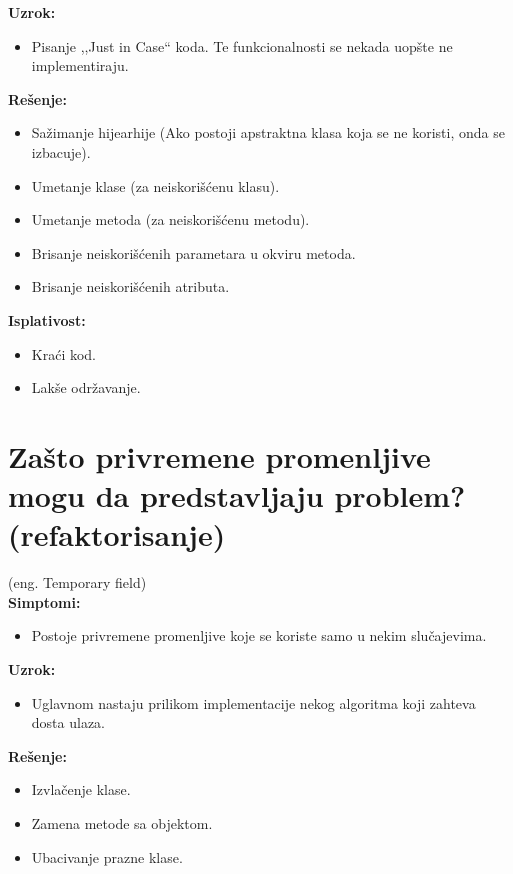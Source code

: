 \documentclass[a4paper]{article}
\begin{document}
  \noindent \textbf{Uzrok:} 
  \begin{itemize}
    \item Pisanje ,,Just in Case`` koda. Te funkcionalnosti se nekada uopšte ne implementiraju.
  \end{itemize}

  \noindent \textbf{Rešenje:} 
  \begin{itemize}
    \item Sažimanje hijearhije (Ako postoji apstraktna klasa koja se ne koristi, onda se izbacuje).
    \item Umetanje klase (za neiskorišćenu klasu).
    \item Umetanje metoda (za neiskorišćenu metodu).
    \item Brisanje neiskorišćenih parametara u okviru metoda.
    \item Brisanje neiskorišćenih atributa.
  \end{itemize}

  \noindent \textbf{Isplativost:} 
  \begin{itemize}
    \item Kraći kod.
    \item Lakše održavanje.
  \end{itemize}

\section{Zašto privremene promenljive mogu da predstavljaju problem? (refaktorisanje)}
  (eng. Temporary field)\\
  \textbf{Simptomi:}
  \begin{itemize}
    \item Postoje privremene promenljive koje se koriste samo u nekim slučajevima.
  \end{itemize}

  \noindent \textbf{Uzrok:} 
  \begin{itemize}
    \item Uglavnom nastaju prilikom implementacije nekog algoritma koji zahteva dosta ulaza.
  \end{itemize}

  \noindent \textbf{Rešenje:} 
  \begin{itemize}
    \item Izvlačenje klase.
    \item Zamena metode sa objektom.
    \item Ubacivanje prazne klase.
  \end{itemize}
\end{document}

